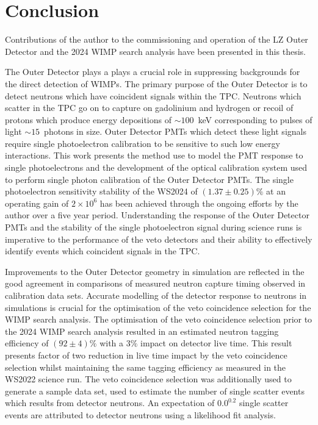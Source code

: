 \chapter{Conclusion}\label{chap:Conclusion}
Contributions of the author to the commissioning and operation of the LZ Outer Detector and the 2024 WIMP search analysis have been presented in this thesis.

The Outer Detector plays a plays a crucial role in suppressing backgrounds for the direct detection of WIMPs. The primary purpose of the Outer Detector is to detect neutrons which have coincident signals within the TPC. Neutrons which scatter in the TPC go on to capture on gadolinium and hydrogen or recoil of protons which produce energy depositions of $\sim100$~keV corresponding to pulses of light $\sim15$~photons in size. Outer Detector PMTs which detect these light signals require single photoelectron calibration to be sensitive to such low energy interactions. This work presents the method use to model the PMT response to single photoelectrons and the development of the optical calibration system used to perform single photon calibration of the Outer Detector PMTs. The single photoelectron sensitivity stability of the WS2024 of $(1.37\pm0.25)\%$ at an operating gain of $2\times10^6$ has been achieved through the ongoing efforts by the author over a five year period. Understanding the response of the Outer Detector PMTs and the stability of the single photoelectron signal during science runs is imperative to the performance of the veto detectors and their ability to effectively identify events which coincident signals in the TPC.

Improvements to the Outer Detector geometry in simulation are reflected in the good agreement in comparisons of measured neutron capture timing observed in calibration data sets. Accurate modelling of the detector response to neutrons in simulations is crucial for the optimisation of the veto coincidence selection for the WIMP search analysis. The optimisation of the veto coincidence selection prior to the 2024 WIMP search analysis resulted in an estimated neutron tagging efficiency of $(92\pm4)\%$ with a $3\%$ impact on detector live time. This result presents factor of two reduction in live time impact by the veto coincidence selection whilst maintaining the same tagging efficiency as measured in the WS2022 science run. The veto coincidence selection was additionally used to generate a sample data set, used to estimate the number of single scatter events which results from detector neutrons. An expectation of $0.0^{0.2}$ single scatter events are attributed to detector neutrons using a likelihood fit analysis.

